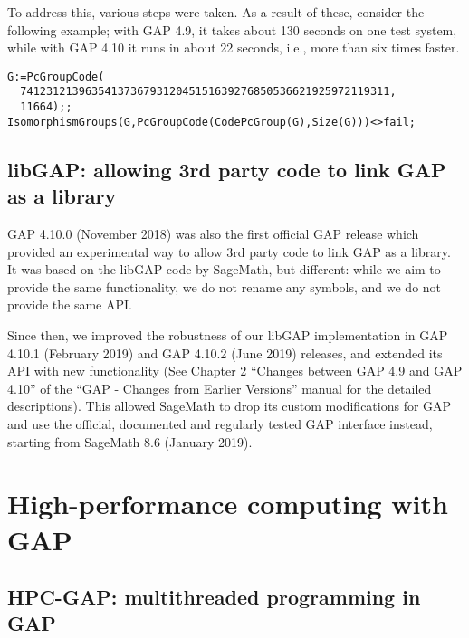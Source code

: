 \documentclass{deliverablereport}
\begin{document}
To address this, various steps were taken.
As a result of these, consider the following 
example; with GAP 4.9, it takes about 130 seconds on one test system, 
while with GAP 4.10 it runs in about 22 seconds, i.e., more than six times faster.

{\small
\begin{verbatim}
G:=PcGroupCode( 
  741231213963541373679312045151639276850536621925972119311,
  11664);;
IsomorphismGroups(G,PcGroupCode(CodePcGroup(G),Size(G)))<>fail;
\end{verbatim}
}



\subsection{libGAP: allowing 3rd party code to link GAP as a library}

GAP 4.10.0 (November 2018) was also the first official GAP release
which provided an experimental way to allow 3rd party code to 
link GAP as a library. It was based on the libGAP code by SageMath, 
but different: while we aim to provide the same functionality, 
we do not rename any symbols, and we do not provide the same API. 

Since then, we improved the robustness of our libGAP implementation
in GAP 4.10.1 (February 2019) and GAP 4.10.2 (June 2019) releases,
and extended its API with new functionality (See Chapter 2 
``Changes between GAP 4.9 and GAP 4.10'' of the 
``GAP - Changes from Earlier Versions'' manual for the detailed
descriptions). This allowed SageMath to drop its custom 
modifications for GAP and use the official, documented and regularly 
tested GAP interface instead, starting from SageMath 8.6 (January 2019).


\section{High-performance computing with GAP}

\subsection{HPC-GAP: multithreaded programming in GAP}\label{hpc-gap}
\end{document}
